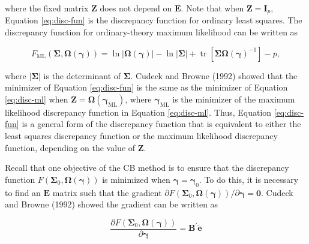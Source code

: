 \documentclass[11pt]{umnthesis}
\DeclareMathOperator{\tr}{tr}
\begin{document}
\noindent where the fixed matrix \(\mathbf{Z}\) does not depend on \(\mathbf{E}\). Note that when \(\mathbf{Z} = \mathbf{I}_p\), Equation \eqref{eq:disc-fun} is the discrepancy function for ordinary least squares. The discrepancy function for ordinary-theory maximum likelihood can be written as

\begin{equation}
F_{\textrm{ML}}(\bm{\Sigma}, \bm{\Omega}(\bm{\gamma})) = \ln |\bm{\Omega}(\bm{\gamma})| - \ln |\bm{\Sigma}| + \tr [\bm{\Sigma} \bm{\Omega}(\bm{\gamma})^{-1}] - p,
\label{eq:disc-ml}
\end{equation}

\noindent where \(|\bm{\Sigma}|\) is the determinant of \(\bm{\Sigma}\). Cudeck and Browne (1992) showed that the minimizer of Equation \eqref{eq:disc-fun} is the same as the minimizer of Equation \eqref{eq:disc-ml} when \(\mathbf{Z} = \bm{\Omega}(\bm{\gamma}_{\textrm{ML}})\), where \(\bm{\gamma}_{\textrm{ML}}\) is the minimizer of the maximum likelihood discrepancy function in Equation \eqref{eq:disc-ml}. Thus, Equation \eqref{eq:disc-fun} is a general form of the discrepancy function that is equivalent to either the least squares discrepancy function or the maximum likelihood discrepancy function, depending on the value of \(\mathbf{Z}\).

Recall that one objective of the CB method is to ensure that the discrepancy function \(F(\bm{\Sigma}_0, \bm{\Omega}(\bm{\gamma}))\) is minimized when \(\bm{\gamma} = \bm{\gamma}_0\). To do this, it is necessary to find an \(\mathbf{E}\) matrix such that the gradient \(\partial F(\bm{\Sigma}_0, \bm{\Omega}(\bm{\gamma})) / \partial \bm{\gamma} = \bm{0}\). Cudeck and Browne (1992) showed the gradient can be written as

\begin{equation}
\frac{\partial F(\bm{\Sigma}_0, \bm{\Omega}(\bm{\gamma}))}{\partial \bm{\gamma}} = \mathbf{B}^\prime \tilde{\mathbf{e}}
\label{eq:gradient-of-F}
\end{equation}
\end{document}
